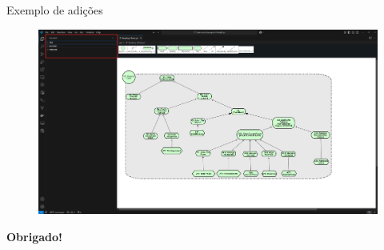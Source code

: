 \documentclass{beamer}
\begin{document}
\begin{frame}{Exemplo de adições}
  \begin{figure}[!h]
    \centering
    \includegraphics[width=1\textwidth]{multiple sections example.png} 
    \caption{}
  \end{figure}
\end{frame}



\begin{frame}{}
    \vspace{1cm}\hspace{5cm}\textbf{Obrigado!}
\end{frame}
\end{document}
